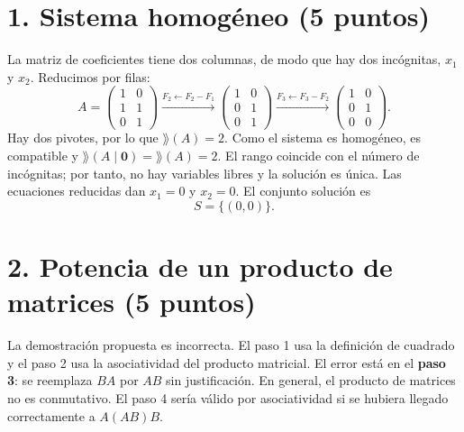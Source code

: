 \documentclass[10pt,a4]{examenEPN0}
\begin{document}
\encabezado

\section*{1. Sistema homogéneo (5 puntos)}
La matriz de coeficientes tiene dos columnas, de modo que hay dos
incógnitas, $x_1$ y $x_2$. Reducimos por filas:
\[
    A=\begin{pmatrix}1&0\\1&1\\0&1\end{pmatrix}
    \xrightarrow{F_2\leftarrow F_2-F_1}
    \begin{pmatrix}1&0\\0&1\\0&1\end{pmatrix}
    \xrightarrow{F_3\leftarrow F_3-F_2}
    \begin{pmatrix}1&0\\0&1\\0&0\end{pmatrix}.
\]
Hay dos pivotes, por lo que $\rang(A)=2$. Como el sistema es homogéneo,
es compatible y $\rang(A\mid\mathbf{0})=\rang(A)=2$. El rango coincide
con el número de incógnitas; por tanto, no hay variables libres y la
solución es única. Las ecuaciones reducidas dan $x_1=0$ y $x_2=0$.
El conjunto solución es
\[
    \boxed{S=\{(0,0)\}.}
\]

\section*{2. Potencia de un producto de matrices (5 puntos)}
La demostración propuesta es incorrecta. El paso 1 usa la definición
de cuadrado y el paso 2 usa la asociatividad del producto matricial.
El error está en el \textbf{paso 3}: se reemplaza $BA$ por $AB$ sin
justificación. En general, el producto de matrices no es conmutativo.
El paso 4 sería válido por asociatividad si se hubiera llegado
correctamente a $A(AB)B$.
\end{document}
